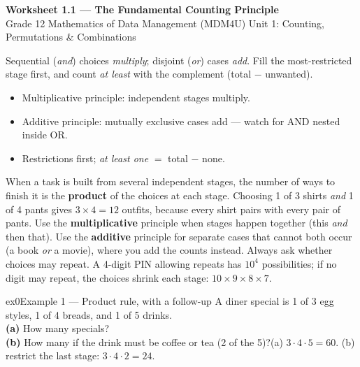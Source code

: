 \documentclass[11pt]{article}
\begin{document}
\begin{center}
{\LARGE\bfseries\color{titleblue}Worksheet 1.1 --- The Fundamental Counting Principle}\\[2pt]
{\small Grade 12 Mathematics of Data Management (MDM4U) \textperiodcentered{} Unit 1: Counting, Permutations \& Combinations}
\end{center}

\begin{ideabox}
Sequential (\emph{and}) choices \emph{multiply}; disjoint (\emph{or}) cases \emph{add}. Fill the most-restricted stage first, and count \emph{at least} with the complement (total $-$ unwanted).
\begin{itemize}[leftmargin=*,itemsep=2pt]
  \item Multiplicative principle: independent stages multiply.
  \item Additive principle: mutually exclusive cases add --- watch for AND nested inside OR.
  \item Restrictions first; \emph{at least one} $=$ total $-$ none.
\end{itemize}
\end{ideabox}

\begin{learnbox}
When a task is built from several independent stages, the number of ways to finish it is the \textbf{product} of the choices at each stage. Choosing 1 of 3 shirts \emph{and} 1 of 4 pants gives $3\times4=12$ outfits, because every shirt pairs with every pair of pants.
Use the \textbf{multiplicative} principle when stages happen together (this \emph{and} then that). Use the \textbf{additive} principle for separate cases that cannot both occur (a book \emph{or} a movie), where you add the counts instead.
Always ask whether choices may repeat. A 4-digit PIN allowing repeats has $10^4$ possibilities; if no digit may repeat, the choices shrink each stage: $10\times9\times8\times7$.
\end{learnbox}


\begin{example}{ex0}{Example 1 --- Product rule, with a follow-up}
A diner special is 1 of 3 egg styles, 1 of 4 breads, and 1 of 5 drinks. \\ \textbf{(a)} How many specials? \\ \textbf{(b)} How many if the drink must be coffee or tea (2 of the 5)?\soln (a) $3\cdot4\cdot5=60$. (b) restrict the last stage: $3\cdot4\cdot2=24$.
\end{example}
\end{document}
